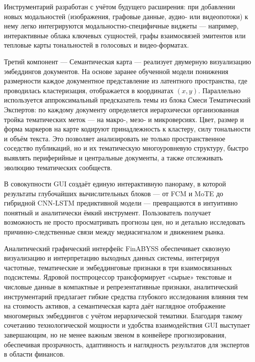 Инструментарий разработан с учётом будущего расширения: при добавлении новых модальностей
(изображения, графовые данные, аудио‑ или видеопотоки) к нему легко интегрируются модальностно‑специфичные
виджеты --- например, интерактивные облака ключевых сущностей, графы взаимосвязей эмитентов
или тепловые карты тональностей в голосовых и видео‑форматах.

Третий компонент --- Семантическая карта --- реализует двумерную визуализацию эмбеддингов документов.
На основе заранее обученной модели понижения размерности каждое документное представление из латентного
пространства, где проводилась кластеризация, отображается в координатах $(x,y)$. Параллельно используется
аппроксимальный предсказатель темы из блока Смеси Тематический Экспертов: по каждому документу
определяется иерархически организованная тройка тематических меток --- на макро‑, мезо‑ и микроверсиях.
Цвет, размер и форма маркеров на карте кодируют принадлежность к кластеру, силу тональности и объём
текста. Это позволяет анализировать не только пространственное соседство публикаций, но и их тематическую
многоуровневую структуру, быстро выявлять периферийные и центральные документы, а также отслеживать
эволюцию тематических сообществ.

В совокупности GUI создаёт единую интерактивную панораму, в которой результаты глубочайших вычислительных блоков
--- от FCM и MoTE до гибридной CNN-LSTM предиктивной модели — превращаются в интуитивно понятный и аналитически
ёмкий инструмент. Пользователь получает возможность не просто просматривать прогнозы цен, но и детально исследовать
причинно‑следственные связи между медиасигналом и движением рынка.

Аналитический графический интерфейс FinABYSS обеспечивает сквозную визуализацию и интерпретацию выходных данных
системы, интегрируя частотные, тематические и эмбеддинговые признаки в три взаимосвязанных подсистемы. Ядровой
постпроцессор трансформирует «сырые» текстовые и числовые данные в компактные и репрезентативные признаки,
аналитический инструментарий предлагает гибкие средства глубокого исследования влияния тем на стоимость активов,
а семантическая карта даёт наглядное отображение многомерных эмбеддингов с учётом иерархической тематики.
Благодаря такому сочетанию технологической мощности и удобства взаимодействия GUI выступает завершающим,
но не менее важным звеном в конвейере прогнозирования, обеспечивая прозрачность, адаптивность и наглядность
результатов для экспертов в области финансов.
